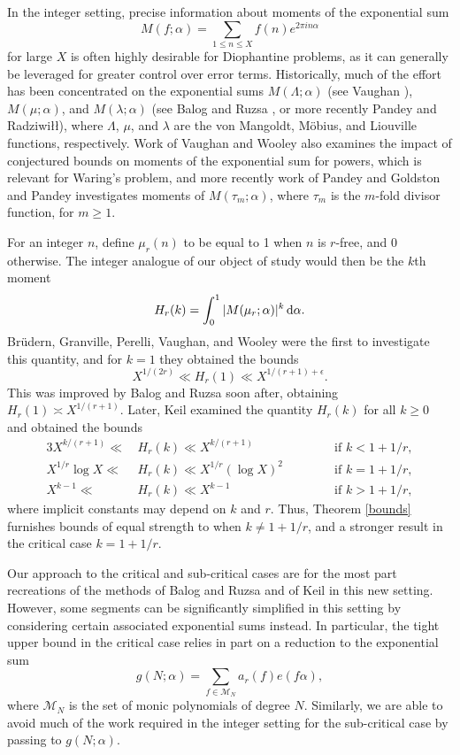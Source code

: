 \documentclass[reqno,11pt]{amsart}
\theoremstyle{definition}
\theoremstyle{remark}
\numberwithin{equation}{section}
\def\calM{{\mathcal M}}
\renewcommand{\d}{\,{\rm d}} %
\newcommand{\<}{\begin{equation}}
\renewcommand{\>}{\end{equation}}
\begin{document}
In the integer setting, precise information about moments of the exponential sum
\[M(f;\alpha) = \sum_{1 \leq n \leq X} f(n)e^{2\pi i n\alpha}\]
for large $X$ is often highly desirable for Diophantine problems, as it can generally be leveraged for greater control over error terms. Historically, much of the effort has been concentrated on the exponential sums $M(\Lambda;\alpha)$ (see Vaughan \cite{vaughan:1988}), $M(\mu;\alpha)$, and $M(\lambda;\alpha)$ (see Balog and Ruzsa \cites{balog-ruzsa:1998,balog-ruzsa:2001}, or more recently Pandey and Radziwi\l\l \;\cite{pandey-radziwill:2023}), where $\Lambda$, $\mu$, and $\lambda$ are the von Mangoldt, M\"obius, and Liouville functions, respectively. Work of Vaughan and Wooley \cite{vaughan-wooley:1998} also examines the impact of conjectured bounds on moments of the exponential sum for powers, which is relevant for Waring's problem, and more recently work of Pandey and Goldston \cite{goldston-pandey:2019} and Pandey \cites{pandey:2018,pandey:2022} investigates moments of $M(\tau_m;\alpha)$, where $\tau_m$ is the $m$-fold divisor function, for $m\geq 1$.

For an integer $n$, define $\mu_r(n)$ to be equal to 1 when $n$ is $r$-free, and $0$ otherwise. The integer analogue of our object of study would then be the $k$th moment
\[H_r(k) = \int_0^1 |M(\mu_r;\alpha)|^k \d\alpha.\]
Br\"udern, Granville, Perelli, Vaughan, and Wooley \cite{brudern-etal:1998} were the first to investigate this quantity, and for $k=1$ they obtained the bounds
\[X^{1/(2r)} \ll H_r(1) \ll X^{1/(r+1)+\epsilon}.\]
This was improved by Balog and Ruzsa \cite{balog-ruzsa:2001} soon after, obtaining $H_r(1) \asymp X^{1/(r+1)}$. Later, Keil \cite{keil:2013} examined the quantity $H_r(k)$ for all $k\geq 0$ and obtained the bounds 
\begin{alignat*}{3}
    X^{k/(r+1)} \ll &\,H_r(k) \ll X^{k/(r+1)} \quad\quad\; &&\text{if } k < 1+1/r, \\
    X^{1/r}\log X \ll &\,H_r(k) \ll X^{1/r} (\log X)^2\quad\quad\;\; &&\text{if } k=1+1/r, \\
    X^{k-1} \ll &\,H_r(k) \ll X^{k-1} \quad\qquad\;\; &&\text{if } k> 1+1/r,
\end{alignat*}
where implicit constants may depend on $k$ and $r$. Thus, Theorem \ref{bounds} furnishes bounds of equal strength to \cite{keil:2013} when $k \neq 1+1/r$, and a stronger result in the critical case $k = 1+1/r$. 

Our approach to the critical and sub-critical cases are for the most part recreations of the methods of Balog and Ruzsa \cite{balog-ruzsa:2001} and of Keil \cite{keil:2013} in this new setting. However, some segments can be significantly simplified in this setting by considering certain associated exponential sums instead. In particular, the tight upper bound in the critical case relies in part on a reduction to the exponential sum
\[g(N;\alpha) = \sum_{f \in \calM_N} a_r(f)e(f\alpha),\]
where $\calM_N$ is the set of monic polynomials of degree $N$. Similarly, we are able to avoid much of the work required in the integer setting for the sub-critical case by passing to $g(N;\alpha)$.
\end{document}
